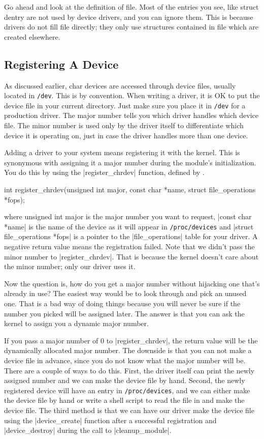 \documentclass[10pt, oneside]{book}
\begin{document}
Go ahead and look at the definition of file.
Most of the entries you see, like struct dentry are not used by device drivers, and you can ignore them.
This is because drivers do not fill file directly; they only use structures contained in file which are created elsewhere.

\subsection{Registering A Device}
\label{sec:register_device}
As discussed earlier, char devices are accessed through device files, usually located in \verb|/dev|.
This is by convention. When writing a driver, it is OK to put the device file in your current directory.
Just make sure you place it in \verb|/dev| for a production driver.
The major number tells you which driver handles which device file.
The minor number is used only by the driver itself to differentiate which device it is operating on, just in case the driver handles more than one device.

Adding a driver to your system means registering it with the kernel.
This is synonymous with assigning it a major number during the module's initialization.
You do this by using the \cpp|register_chrdev| function, defined by .

\begin{code}
int register_chrdev(unsigned int major, const char *name, struct file_operations *fops);
\end{code}

where unsigned int major is the major number you want to request, \cpp|const char *name| is the name of the device as it will appear in \verb|/proc/devices| and \cpp|struct file_operations *fops| is a pointer to the \cpp|file_operations| table for your driver.
A negative return value means the registration failed. Note that we didn't pass the minor number to \cpp|register_chrdev|.
That is because the kernel doesn't care about the minor number; only our driver uses it.

Now the question is, how do you get a major number without hijacking one that's already in use?
The easiest way would be to look through  and pick an unused one.
That is a bad way of doing things because you will never be sure if the number you picked will be assigned later.
The answer is that you can ask the kernel to assign you a dynamic major number.

If you pass a major number of 0 to \cpp|register_chrdev|, the return value will be the dynamically allocated major number.
The downside is that you can not make a device file in advance, since you do not know what the major number will be.
There are a couple of ways to do this.
First, the driver itself can print the newly assigned number and we can make the device file by hand.
Second, the newly registered device will have an entry in \verb|/proc/devices|, and we can either make the device file by hand or write a shell script to read the file in and make the device file.
The third method is that we can have our driver make the device file using the \cpp|device_create| function after a successful registration and \cpp|device_destroy| during the call to \cpp|cleanup_module|.
\end{document}
